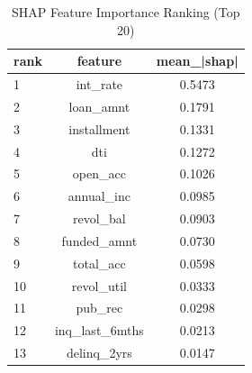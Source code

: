 \begin{table}
\centering
\caption{SHAP Feature Importance Ranking (Top 20)}
\label{tab:shap_ranking}
\begin{tabular}{lcc}
\toprule
rank & feature & mean_|shap| \\
\midrule
1 & int_rate & 0.5473 \\
2 & loan_amnt & 0.1791 \\
3 & installment & 0.1331 \\
4 & dti & 0.1272 \\
5 & open_acc & 0.1026 \\
6 & annual_inc & 0.0985 \\
7 & revol_bal & 0.0903 \\
8 & funded_amnt & 0.0730 \\
9 & total_acc & 0.0598 \\
10 & revol_util & 0.0333 \\
11 & pub_rec & 0.0298 \\
12 & inq_last_6mths & 0.0213 \\
13 & delinq_2yrs & 0.0147 \\
\bottomrule
\end{tabular}
\end{table}
